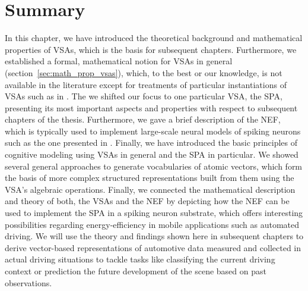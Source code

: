 \section{Summary}
In this chapter, we have introduced the theoretical background and mathematical properties of \aclp{VSA}, which is the basis for subsequent chapters.
Furthermore, we established a formal, mathematical notion for \acp{VSA} in general (section~\ref{sec:math_prop_vsas}), which, to the best or our knowledge, is not available in the literature except for treatments of particular instantiations of \acp{VSA} such as in \textcites{Plate1994}{Gayler1998}{Kanerva2009}.
The we shifted our focus to one particular \ac{VSA}, the \ac{SPA}, presenting its most important aspects and properties with respect to subsequent chapters of the thesis.
Furthermore, we gave a brief description of the \acl{NEF}, which is typically used to implement large-scale neural models of spiking neurons such as the one presented in \textcite{Eliasmith2012}.
Finally, we have introduced the basic principles of cognitive modeling using \acp{VSA} in general and the \ac{SPA} in particular.
We showed several general approaches to generate vocabularies of atomic vectors, which form the basis of more complex structured representations built from them using the \ac{VSA}'s algebraic operations.
Finally, we connected the mathematical description and theory of both, the \acp{VSA} and the \ac{NEF} by depicting how the \ac{NEF} can be used to implement the \ac{SPA} in a spiking neuron substrate, which offers interesting possibilities regarding energy-efficiency in mobile applications such as automated driving.
We will use the theory and findings shown here in subsequent chapters to derive vector-based representations of automotive data measured and collected in actual driving situations to tackle tasks like classifying the current driving context or prediction the future development of the scene based on past observations.
